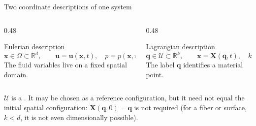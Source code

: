 \documentclass[aspectratio=169,11pt]{beamer}
\newcommand{\xvec}{\bm{x}}
\newcommand{\Xvec}{\bm{q}}
\newcommand{\chivec}{\bm{X}}
\newcommand{\uvec}{\bm{u}}
\begin{document}
\begin{frame}{Two coordinate descriptions of one system}
\begin{columns}[T,onlytextwidth]
  \begin{column}{0.48\textwidth}
    \begin{block}{Eulerian description}
      \[
        \xvec\in\Omega\subset\mathbb{R}^{d},
        \qquad
        \uvec=\uvec(\xvec,t),\quad p=p(\xvec,t).
      \]
      The fluid variables live on a fixed spatial domain.
    \end{block}
  \end{column}
  \begin{column}{0.48\textwidth}
    \begin{block}{Lagrangian description}
      \[
        \Xvec\in\mathcal U\subset\mathbb{R}^{k},
        \qquad
        \xvec=\chivec(\Xvec,t),\quad k\le d.
      \]
      The label \(\Xvec\) identifies a material point.
    \end{block}
  \end{column}
\end{columns}

\medskip
\begin{punchbox}
\(\mathcal U\) is a . It may be chosen as a reference configuration, but it need not equal the initial spatial configuration: \(\chivec(\Xvec,0)=\Xvec\) is not required (for a fiber or surface, \(k<d\), it is not even dimensionally possible).
\end{punchbox}

\smallskip
{}
\end{frame}
\end{document}
